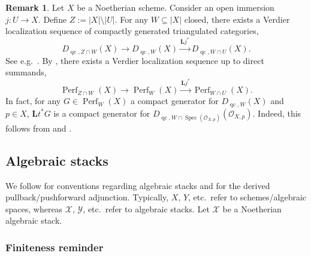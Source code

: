 \documentclass[11pt]{amsart}
\theoremstyle{plain}
\theoremstyle{definition}
\newtheorem{remark}[theorem]{Remark}
\numberwithin{equation}{section}
\numberwithin{theorem}{section}
\begin{document}
\begin{remark}
    \label{rmk:relative_perf_dense_localization}
    Let $X$ be a Noetherian scheme. 
    Consider an open immersion $j\colon U \to X$. Define $Z:= |X|\setminus |U|$. 
    For any $W\subseteq |X|$ closed, there exists a Verdier localization sequence of compactly generated triangulated categories,
    \begin{displaymath}
        D_{\operatorname{qc}, Z\cap W}(X) \to D_{\operatorname{qc},W} (X) \xrightarrow{\mathbf{L}j^\ast} D_{\operatorname{qc},W\cap U}(X).
    \end{displaymath}
    See e.g.\ \cite[Proposition 3.1]{Lank:2026}. 
    By \cite[Theorem 2.1]{Neeman:1996}, there exists a Verdier localization sequence up to direct summands,
    \begin{displaymath}
        \operatorname{Perf}_{Z\cap W}(X) \to \operatorname{Perf}_W (X) \xrightarrow{\mathbf{L}j^\ast} \operatorname{Perf}_{W\cap U}(X).
    \end{displaymath}
    In fact, for any $G\in \operatorname{Perf}_W (X)$ a compact generator for $D_{\operatorname{qc},W}(X)$ and $p\in X$, $\mathbf{L}t^\ast G$ is a compact generator for $D_{\operatorname{qc},W\cap \operatorname{Spec}(\mathcal{O}_{X,p})}(\mathcal{O}_{X,p})$. 
    Indeed, this follows from \cite[Lemma 4.8(2)]{Hall/Rydh:2017} and \cite[Lemma 1.2]{Neeman:1992}.
\end{remark}

\subsection{Algebraic stacks}
\label{sec:prelim_stacks}

We follow \cite{stacks-project} for conventions regarding algebraic stacks and \cite[\S1]{Hall/Rydh:2017} for the derived pullback/pushforward adjunction. 
Typically, $X$, $Y$, etc.\ refer to schemes/algebraic spaces, whereas $\mathcal{X}$, $\mathcal{Y}$, etc.\ refer to algebraic stacks. 
Let $\mathcal{X}$ be a Noetherian algebraic stack. 

\subsubsection{Finiteness reminder}
\label{sec:prelim_stacks_finiteness}
\end{document}
